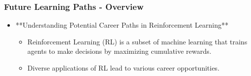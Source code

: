 \documentclass[aspectratio=169]{beamer}
\begin{document}
\begin{frame}[fragile]
    \frametitle{Future Learning Paths - Overview}
    \begin{itemize}
        \item **Understanding Potential Career Paths in Reinforcement Learning**
        \begin{itemize}
            \item Reinforcement Learning (RL) is a subset of machine learning that trains agents to make decisions by maximizing cumulative rewards.
            \item Diverse applications of RL lead to various career opportunities.
        \end{itemize}
    \end{itemize}
\end{frame}
\end{document}
